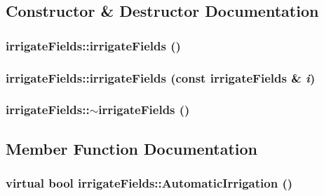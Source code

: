 \subsection{Constructor \& Destructor Documentation}
\hypertarget{classirrigate_fields_a5033ec5eccc0361ee9253addbdee93bb}{
\subsubsection[{irrigateFields}]{\setlength{\rightskip}{0pt plus 5cm}irrigateFields::irrigateFields ()}}
\label{classirrigate_fields_a5033ec5eccc0361ee9253addbdee93bb}
\hypertarget{classirrigate_fields_a73b818c0ab612132a1235cde4a0dd517}{
\subsubsection[{irrigateFields}]{\setlength{\rightskip}{0pt plus 5cm}irrigateFields::irrigateFields (const {\bf irrigateFields} \& {\em i})}}
\label{classirrigate_fields_a73b818c0ab612132a1235cde4a0dd517}
\hypertarget{classirrigate_fields_ac5ca7243c3b7db8724565012459482e7}{
\subsubsection[{$\sim$irrigateFields}]{\setlength{\rightskip}{0pt plus 5cm}irrigateFields::$\sim$irrigateFields ()}}
\label{classirrigate_fields_ac5ca7243c3b7db8724565012459482e7}


\subsection{Member Function Documentation}
\hypertarget{classirrigate_fields_a288149c6a4e9bc3d60cf8f3494aa274f}{
\subsubsection[{AutomaticIrrigation}]{\setlength{\rightskip}{0pt plus 5cm}virtual bool irrigateFields::AutomaticIrrigation ()}}
\label{classirrigate_fields_a288149c6a4e9bc3d60cf8f3494aa274f}


